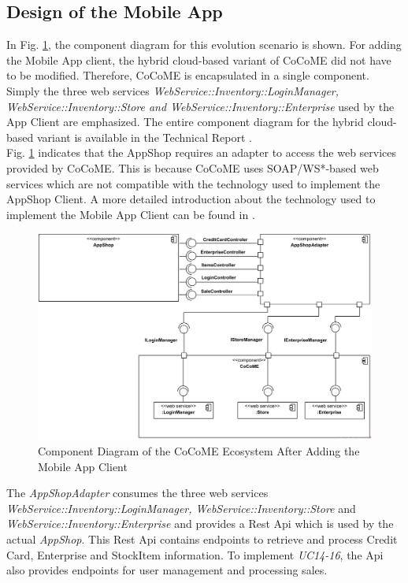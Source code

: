 \subsection{Design of the Mobile App}\label{DesignMobileApp}
 In Fig. \ref{ComponentApp}, the component diagram for this evolution scenario is shown. For adding the Mobile App client, the hybrid cloud-based variant of CoCoME did not have to be modified. Therefore, CoCoME is encapsulated in a single component. Simply the three web services \textit{WebService::Inventory::LoginManager, WebService::Inventory::Store and WebService::Inventory::Enterprise} used by the App Client are emphasized. The entire component diagram for the hybrid cloud-based variant is available in the Technical Report \cite{SWB-469002735}. 
 \\ Fig. \ref{ComponentApp} indicates that the AppShop requires an adapter to access the web services provided by CoCoME. This is because CoCoME uses SOAP/WS*-based web services which are not compatible with the technology used to implement the AppShop Client. A more detailed introduction about the technology used to implement the Mobile App Client can be found in \cite{schnabel}. 
  
 \begin{figure}[!h]
	\includegraphics[width=\textwidth]{img/appComponent.png}
	\caption{Component Diagram of the CoCoME Ecosystem After Adding the Mobile App Client}
	\label{ComponentApp}
\end{figure}

  The \textit{AppShopAdapter} consumes the three web services \textit{WebService::Inventory::LoginManager, WebService::Inventory::Store} and \textit{WebService::Inventory::Enterprise} and provides a Rest Api which is used by the actual \textit{AppShop}. This Rest Api contains endpoints to retrieve and process Credit Card, Enterprise and StockItem information. To implement \emph{UC14-16}, the Api also provides endpoints for user management and processing sales. 
  
